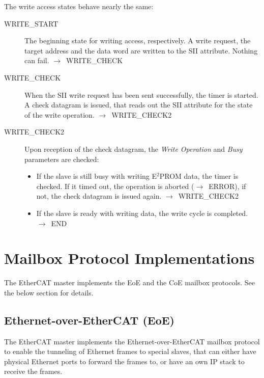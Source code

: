 \documentclass[a4paper,12pt,BCOR6mm,bibtotoc,idxtotoc]{scrbook}
\begin{document}
The write access states behave nearly the same:

\begin{description}
\item[WRITE\_START] The beginning state for writing access,
  respectively. A write request, the target address and the data word
  are written to the SII attribute. Nothing can fail.
  $\rightarrow$~WRITE\_CHECK

\item[WRITE\_CHECK] When the SII write request has been sent
  successfully, the timer is started. A check datagram is issued, that
  reads out the SII attribute for the state of the write operation.
  $\rightarrow$~WRITE\_CHECK2

\item[WRITE\_CHECK2] Upon reception of the check datagram, the
  \textit{Write Operation} and \textit{Busy} parameters are checked:
  \begin{itemize}
  \item If the slave is still busy with writing E$^2$PROM data, the
    timer is checked. If it timed out, the operation is aborted
    ($\rightarrow$~ERROR), if not, the check datagram is issued again.
    $\rightarrow$~WRITE\_CHECK2
  \item If the slave is ready with writing data, the write cycle is
    completed. $\rightarrow$~END
  \end{itemize}
\end{description}


\chapter{Mailbox Protocol Implementations}

The EtherCAT master implements the EoE and the CoE mailbox
protocols. See the below section for details.


\section{Ethernet-over-EtherCAT (EoE)}
\label{sec:eoeimp}

The EtherCAT master implements the Ethernet-over-EtherCAT mailbox
protocol to enable the tunneling of Ethernet frames to special slaves,
that can either have physical Ethernet ports to forward the frames to,
or have an own IP stack to receive the frames.
\end{document}
